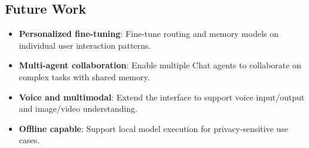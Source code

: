 \subsection{Future Work}

\begin{itemize}[leftmargin=1.1em]
    \item \textbf{Personalized fine-tuning}: Fine-tune routing and memory models on individual user interaction patterns.
    \item \textbf{Multi-agent collaboration}: Enable multiple Chat agents to collaborate on complex tasks with shared memory.
    \item \textbf{Voice and multimodal}: Extend the interface to support voice input/output and image/video understanding.
    \item \textbf{Offline capable}: Support local model execution for privacy-sensitive use cases.
\end{itemize}

